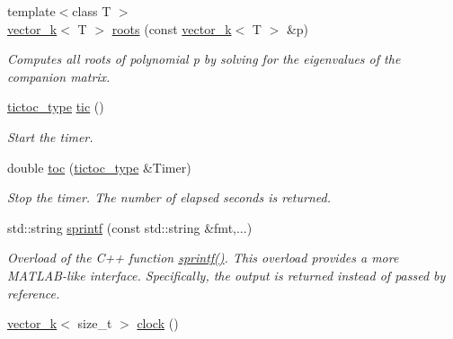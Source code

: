 \begin{DoxyCompactItemize}
\item 
\hypertarget{namespacekeycpp_a21cb545ca871d88bcd449b61bd8bdbfb}{{\footnotesize template$<$class T $>$ }\\\hyperlink{classkeycpp_1_1vector__k}{vector\-\_\-k}$<$ T $>$ \hyperlink{namespacekeycpp_a21cb545ca871d88bcd449b61bd8bdbfb}{roots} (const \hyperlink{classkeycpp_1_1vector__k}{vector\-\_\-k}$<$ T $>$ \&p)}\label{namespacekeycpp_a21cb545ca871d88bcd449b61bd8bdbfb}

\begin{DoxyCompactList}\small\item\em Computes all roots of polynomial p by solving for the eigenvalues of the companion matrix. \end{DoxyCompactList}\item 
\hypertarget{namespacekeycpp_a6069a9eec0edfa1d401230013d98765e}{\hyperlink{structkeycpp_1_1tictoc__type}{tictoc\-\_\-type} \hyperlink{namespacekeycpp_a6069a9eec0edfa1d401230013d98765e}{tic} ()}\label{namespacekeycpp_a6069a9eec0edfa1d401230013d98765e}

\begin{DoxyCompactList}\small\item\em Start the timer. \end{DoxyCompactList}\item 
\hypertarget{namespacekeycpp_afe03fbbb5126729fb4b9367097acb1d1}{double \hyperlink{namespacekeycpp_afe03fbbb5126729fb4b9367097acb1d1}{toc} (\hyperlink{structkeycpp_1_1tictoc__type}{tictoc\-\_\-type} \&Timer)}\label{namespacekeycpp_afe03fbbb5126729fb4b9367097acb1d1}

\begin{DoxyCompactList}\small\item\em Stop the timer. The number of elapsed seconds is returned. \end{DoxyCompactList}\item 
\hypertarget{namespacekeycpp_a9d70a761d33bbc2bdec6b4e0eb43d517}{std\-::string \hyperlink{namespacekeycpp_a9d70a761d33bbc2bdec6b4e0eb43d517}{sprintf} (const std\-::string \&fmt,...)}\label{namespacekeycpp_a9d70a761d33bbc2bdec6b4e0eb43d517}

\begin{DoxyCompactList}\small\item\em Overload of the C++ function \hyperlink{namespacekeycpp_a9d70a761d33bbc2bdec6b4e0eb43d517}{sprintf()}. This overload provides a more M\-A\-T\-L\-A\-B-\/like interface. Specifically, the output is returned instead of passed by reference. \end{DoxyCompactList}\item 
\hypertarget{namespacekeycpp_a806f0afebdf1131be26a05d7a4a23044}{\hyperlink{classkeycpp_1_1vector__k}{vector\-\_\-k}$<$ size\-\_\-t $>$ \hyperlink{namespacekeycpp_a806f0afebdf1131be26a05d7a4a23044}{clock} ()}\label{namespacekeycpp_a806f0afebdf1131be26a05d7a4a23044}


\end{DoxyCompactItemize}
